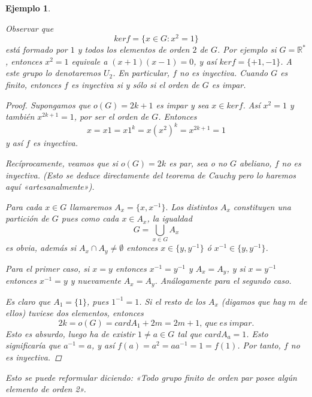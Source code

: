 \documentclass[12pt]{article}
\newtheorem{example}{Ejemplo}[theorem]
\begin{document}
\begin{example}
\begin{enumerate}
Observar que $$ker f = \lbrace x \in G : x^{2} = 1\rbrace$$ está formado por $1$ y todos los elementos de orden $2$ de $G$. Por ejemplo si $G = \mathbb{R}^{\ast}$, entonces $x^{2} = 1$ equivale a $(x+1)(x-1) = 0$, y así $ker f = \lbrace +1,-1\rbrace$. A este grupo lo denotaremos $U_{2}$. En particular, $f$ no es inyectiva. Cuando $G$ es finito, entonces $f$ es inyectiva si y sólo si el orden de $G$ es impar.

\begin{proof}Supongamos que $o(G) = 2k+1$ es impar y sea $x \in ker f$. Así $x^{2} = 1$ y también $x^{2k+1} = 1$, por ser el orden de $G$. Entonces $$x = x1 = x1^{k} = x(x^{2})^{k} = x^{2k+1} = 1$$ y así $f$ es inyectiva.

Recíprocamente, veamos que si $o(G) = 2k$ es par, sea o no $G$ abeliano, $f$ no es inyectiva. (Esto se deduce directamente del teorema de Cauchy pero lo haremos aquí «artesanalmente»).

Para cada $x \in G$ llamaremos $A_{x} = \lbrace x, x^{-1}\rbrace.$ Los distintos $A_{x}$ constituyen una partición de $G$ pues como cada $x \in A_{x}$, la igualdad $$G = \bigcup_{x \in G} A_{x}$$ es obvia, además si $A_{x}\cap A_{y} \neq \emptyset$ entonces $x \in \lbrace y, y^{-1}\rbrace$ ó $x^{-1} \in \lbrace y,y^{-1}\rbrace$.

Para el primer caso, si $x = y$ entonces $x^{-1} = y^{-1}$ y $A_{x} = A_{y}$, y si $x = y^{-1}$ entonces $x^{-1} = y$ y nuevamente $A_{x} = A_{y}$. Análogamente para el segundo caso.

Es claro que $A_{1} = \lbrace 1 \rbrace$, pues $1^{-1} = 1$. Si el resto de los $A_{x}$ (digamos que hay $m$ de ellos) tuviese dos elementos, entonces $$2k = o(G) = card A_{1} + 2m = 2m +1,~que~es~impar.$$ Esto es absurdo, luego ha de existir $1 \neq a \in G$ tal que $card A_{a} = 1$. Esto significaría que $a^{-1} = a$, y así $f(a) = a^{2} = aa^{-1} = 1 = f(1)$. Por tanto, $f$ no es inyectiva.

\end{proof}
Esto se puede reformular diciendo: \textit{«Todo grupo finito de orden par posee algún elemento de orden 2»}. 


\end{enumerate}
\end{example}
\end{document}
